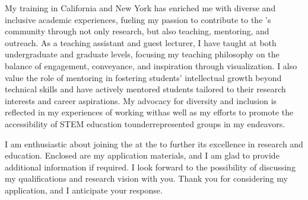 

My training in California and New York has enriched me with diverse and inclusive academic experiences, fueling my passion to contribute to the \appSchool{}'s community through not only research, but also teaching, mentoring, and outreach. As a teaching assistant and guest lecturer, I have taught at both undergraduate and graduate levels, focusing my teaching philosophy on the balance of engagement, conveyance, and inspiration through visualization. I also value the role of mentoring in fostering students' intellectual growth beyond technical skills and have actively mentored students tailored to their research interests and career aspirations. My advocacy for diversity and inclusion is reflected in my experiences of working with\textemdash as well as my efforts to promote the accessibility of STEM education to\textemdash underrepresented groups in my endeavors.

I am enthusiastic about joining the \appDept{} at the \appSchool{} to further its excellence in research and education. Enclosed are my application materials, and I am glad to provide additional information if required. I look forward to the possibility of discussing my qualifications and research vision with you. Thank you for considering my application, and I anticipate your response.


